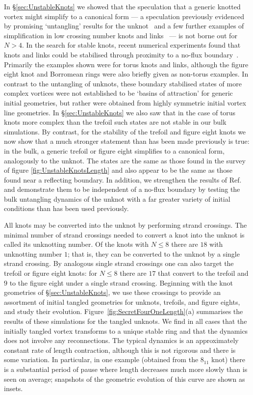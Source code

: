 In \S \ref{sec:UnstableKnots} we showed that the speculation that a generic knotted vortex might simplify to a canonical form --- a speculation previously evidenced by promising `untangling' results for the unknot~\citep{Maucher2016} and a few further examples of simplification in low crossing number knots and links~\citep{Sutcliffe2003,Maucher2019} --- is not borne out for $N>4$. In the search for stable knots, recent numerical experiments found that knots and links could be stabilised through proximity to a no-flux boundary~\citep{Sutcliffe2003,Maucher2017}. Primarily the examples shown were for torus knots and links, although the figure eight knot and Borromean rings were also briefly given as non-torus examples. In contrast to the untangling of unknots, these boundary stabilised states of more complex vortices were not established to be `basins of attraction' for generic initial geometries, but rather were obtained from highly symmetric initial vortex line geometries. In \S \ref{sec:UnstableKnots} we also saw that in the case of torus knots more complex than the trefoil such states are not stable in our bulk simulations. By contrast, for the stability of the trefoil and figure eight knots we now show that a much stronger statement than has been made previously is true: in the bulk, a generic trefoil or figure eight simplifies to a canonical form, analogously to the unknot. The states are the same as those found in the survey of figure \ref{fig:UnstableKnotsLength} and also appear to be the same as those found near a reflecting boundary. In addition, we strengthen the results of Ref.~\citep{Maucher2016} and demonstrate them to be independent of a no-flux boundary by testing the bulk untangling dynamics of the unknot with a far greater variety of initial conditions than has been used previously.

All knots may be converted into the unknot by performing strand crossings. The minimal number of strand crossings needed to convert a knot into the unknot is called its unknotting number. Of the knots with $N\leq8$ there are $18$ with unknotting number $1$; that is, they can be converted to the unknot by a single strand crossing. By analogous single strand crossings one can also target the trefoil or figure eight knots: for $N\leq8$ there are $17$ that convert to the trefoil and $9$ to the figure eight under a single strand crossing. Beginning with the knot geometries of \S \ref{sec:UnstableKnots}, we use these crossings to provide an assortment of initial tangled geometries for unknots, trefoils, and figure eights, and study their evolution. Figure~\ref{fig:SecretFourOneLength}(a) summarises the results of these simulations for the tangled unknots. We find in all cases that the initially tangled vortex transforms to a unique stable ring and that the dynamics does not involve any reconnections. The typical dynamics is an approximately constant rate of length contraction, although this is not rigorous and there is some variation. In particular, in one example (obtained from the $8_{11}$ knot) there is a substantial period of pause where length decreases much more slowly than is seen on average; snapshots of the geometric evolution of this curve are shown as insets. 

